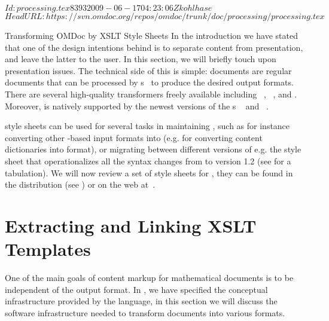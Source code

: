 \svnInfo $Id: processing.tex 8393 2009-06-17 04:23:06Z kohlhase $
\svnKeyword $HeadURL: https://svn.omdoc.org/repos/omdoc/trunk/doc/processing/processing.tex $

\begin{omgroup}[id=transform-xsl,short=Transforming OMDoc]
                           {Transforming OMDoc by XSLT Style Sheets}
In the introduction we have stated that one of the design intentions behind
{\omdoc} is to separate content from presentation, and leave the latter to the
user. In this section, we will briefly touch upon presentation issues. The
technical side of this is simple: {\omdoc} documents are regular {\xml} documents
that can be processed by {\xslt} {s}~\cite{Clark:xslt99} to
produce the desired output formats. There are several high-quality {\xslt}
transformers freely available including {}~\cite{saxon_web},
{}~\cite{xalan_web}, and {}\cite{xsltproc_web}.
Moreover, {\xslt} is natively supported by the newest versions of the
{}s {\msie}~\cite{ie_web} and
{\mozilla}~\cite{mozilla_web}.

{\xslt} style sheets can be used for several tasks in maintaining {\omdoc}, such as for
instance converting other {\xml}-based input formats into {\omdoc} (e.g.
{} for converting {\openmath} content dictionaries into {\omdoc} format), or migrating between different versions of {\omdoc}
e.g. the style sheet {} that operationalizes all the
syntax changes from {} to version 1.2 (see {} for a
tabulation).  We will now review a set of {\xslt} style sheets for {\omdoc}, they can be
found in the {\omdoc} distribution (see {}) or on the web
at~\cite{OMDocXSL:URL}.

\section{Extracting and Linking XSLT Templates}\label{sec:extract-link-xslt}
One of the main goals of content markup for mathematical documents is to be
independent of the output format. In {}, we have specified the
conceptual infrastructure provided by the {\omdoc} language, in this section we
will discuss the software infrastructure needed to transform {\omdoc} documents
into various formats.


\end{omgroup}
